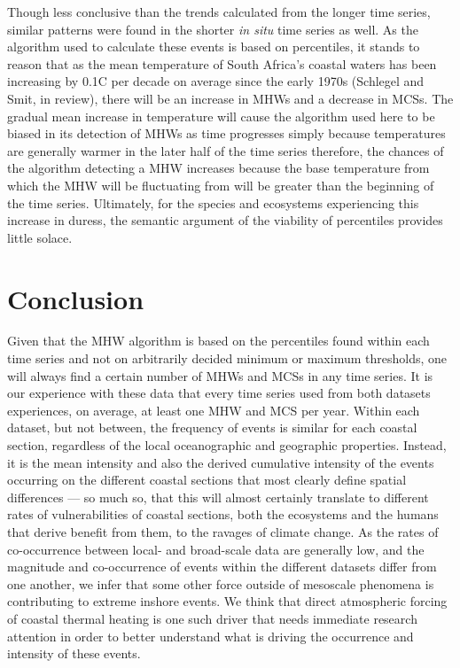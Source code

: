 \documentclass[a4paper,10pt,review]{elsarticle}
\begin{document}
Though less conclusive than the trends calculated from the longer time series, similar patterns were found in the shorter \emph{in situ} time series as well. As the algorithm used to calculate these events is based on percentiles, it stands to reason that as the mean temperature of South Africa's coastal waters has been increasing by 0.1\degree C per decade on average since the early 1970s (Schlegel and Smit, in review), there will be an increase in MHWs and a decrease in MCSs. The gradual mean increase in temperature will cause the algorithm used here to be biased in its detection of MHWs as time progresses simply because temperatures are generally warmer in the later half of the time series therefore, the chances of the algorithm detecting a MHW increases because the base temperature from which the MHW will be fluctuating from will be greater than the beginning of the time series. Ultimately, for the species and ecosystems experiencing this increase in duress, the semantic argument of the viability of percentiles provides little solace. 

\section{Conclusion}
Given that the MHW algorithm is based on the percentiles found within each time series and not on arbitrarily decided minimum or maximum thresholds, one will always find a certain number of MHWs and MCSs in any time series. It is our experience with these data that every time series used from both datasets experiences, on average, at least one MHW and MCS per year. Within each dataset, but not between, the frequency of events is similar for each coastal section, regardless of the local oceanographic and geographic properties. Instead, it is the mean intensity and also the derived cumulative intensity of the events occurring on the different coastal sections that most clearly define spatial differences --- so much so, that this will almost certainly translate to different rates of vulnerabilities of coastal sections, both the ecosystems and the humans that derive benefit from them, to the ravages of climate change. As the rates of co-occurrence between local- and broad-scale data are generally low, and the magnitude and co-occurrence of events within the different datasets differ from one another, we infer that some other force outside of mesoscale phenomena is contributing to extreme inshore events. We think that direct atmospheric forcing of coastal thermal heating is one such driver that needs immediate research attention in order to better understand what is driving the occurrence and intensity of these events.
\end{document}

